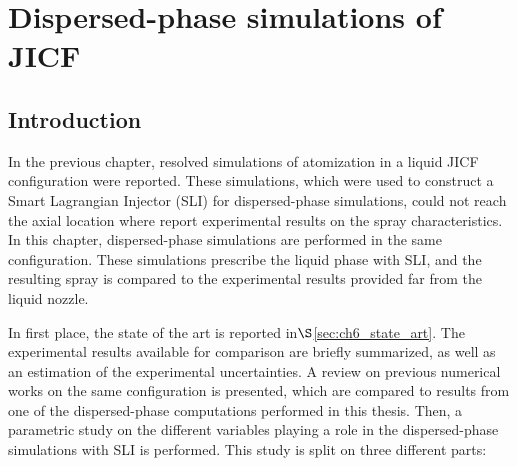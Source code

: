 \chapter{Dispersed-phase simulations of JICF}
	\label{ch6:jicf_lgs_simulations}


%
%
%	
%	
%	
%	
%


\section{Introduction}

In the previous chapter, resolved simulations of atomization in a liquid JICF configuration were reported. These simulations, which were used to construct a Smart Lagrangian Injector (SLI) for dispersed-phase simulations, could not reach the axial location where  report experimental results on the spray characteristics. In this chapter, dispersed-phase simulations are performed in the same configuration. These simulations prescribe the liquid phase with SLI, and the resulting spray is compared to the experimental results provided far from the liquid nozzle.

In first place, the state of the art is reported in$\S$\ref{sec:ch6_state_art}. The experimental results available for comparison are briefly summarized, as well as an estimation of the experimental uncertainties. A review on previous numerical works on the same configuration is presented, which are compared to results from one of the dispersed-phase computations performed in this thesis. Then, a parametric study on the different variables playing a role in the dispersed-phase simulations with SLI is performed. This study is split on three different parts:

